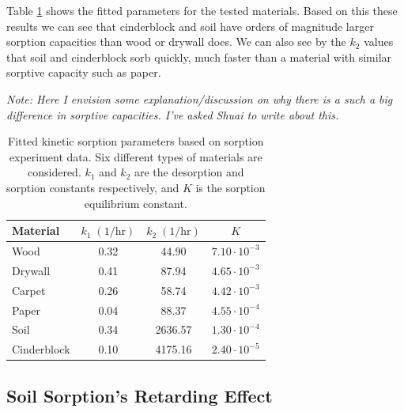 Table \ref{tbl:sorption_fit} shows the fitted parameters for the tested materials.
Based on this these results we can see that cinderblock and soil have orders of magnitude larger sorption capacities than wood or drywall does.
We can also see by the $k_2$ values that soil and cinderblock sorb quickly, much faster than a material with similar sorptive capacity such as paper.\par
\textit{Note: Here I envision some explanation/discussion on why there is a such a big difference in sorptive capacities. I've asked Shuai to write about this.}

\begin{table}[htb!]
  \caption{Fitted kinetic sorption parameters based on sorption experiment data. Six different types of materials are considered. $k_1$ and $k_2$ are the desorption and sorption constants respectively, and $K$ is the sorption equilibrium constant.}
  \label{tbl:sorption_fit}
  \centering
  \begin{tabular}{l c c c}
    \toprule
    Material & $k_1 \; \mathrm{(1/hr)}$ & $k_2 \; \mathrm{(1/hr)}$ & $K$ \\
    \hline
    Wood & 0.32 & 44.90 & $7.10 \cdot 10^{-3}$ \\
    Drywall & 0.41 & 87.94 & $4.65 \cdot 10^{-3}$ \\
    Carpet & 0.26 & 58.74 & $4.42 \cdot 10^{-3}$ \\
    Paper & 0.04 & 88.37 & $4.55 \cdot 10^{-4}$ \\
    Soil & 0.34 & 2636.57 & $1.30 \cdot 10^{-4}$ \\
    Cinderblock & 0.10 & 4175.16 & $2.40 \cdot 10^{-5}$ \\
    \bottomrule
  \end{tabular}
\end{table}

\subsection{Soil Sorption's Retarding Effect}\label{sec:retardation_effect}


